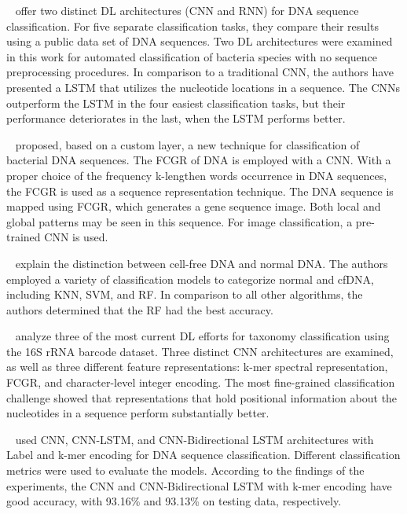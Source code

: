 \citeauthor{LoBosco2017DeepClassification}~\cite{LoBosco2017DeepClassification} offer two distinct \gls{DL} architectures (\gls{CNN} and \gls{RNN}) for \gls{DNA} sequence classification. For five separate classification tasks, they compare their results using a public data set of \gls{DNA} sequences. Two \gls{DL} architectures were examined in this work for automated classification of bacteria species with no sequence preprocessing procedures. In comparison to a traditional \gls{CNN}, the authors have presented a \gls{LSTM} that utilizes the nucleotide locations in a sequence. The \gls{CNN}s outperform the \gls{LSTM} in the four easiest classification tasks, but their performance deteriorates in the last, when the \gls{LSTM} performs better. %

\citeauthor{Abd-Alhalem2020BacterialLayers}~\cite{Abd-Alhalem2020BacterialLayers} proposed, based on a custom layer, a new technique for classification of bacterial \gls{DNA} sequences. The \gls{FCGR} of \gls{DNA} is employed with a \gls{CNN}. With a proper choice of the frequency k-lengthen words occurrence in \gls{DNA} sequences, the \gls{FCGR} is used as a sequence representation technique. The \gls{DNA} sequence is mapped using \gls{FCGR}, which generates a gene sequence image. Both local and global patterns may be seen in this sequence. For image classification, a pre-trained \gls{CNN} is used. 

\citeauthor{Chen2017AClassification}~\cite{Chen2017AClassification} explain the distinction between cell-free DNA and normal DNA. The authors employed a variety of classification models to categorize normal and cfDNA, including \gls{KNN}, \gls{SVM}, and \gls{RF}. In comparison to all other algorithms, the authors determined that the \gls{RF} had the best accuracy. %

\citeauthor{Helaly2019ConvolutionalStudy}~\cite{Helaly2019ConvolutionalStudy} analyze three of the most current \gls{DL} efforts for taxonomy classification using the 16S rRNA barcode dataset. Three distinct \gls{CNN} architectures are examined, as well as three different feature representations: k-mer spectral representation, \gls{FCGR}, and character-level integer encoding. The most fine-grained classification challenge showed that representations that hold positional information about the nucleotides in a sequence perform substantially better.

\citeauthor{Gunasekaran2021AnalysisModels}~\cite{Gunasekaran2021AnalysisModels} used \gls{CNN}, \gls{CNN}-\gls{LSTM}, and \gls{CNN}-Bidirectional \gls{LSTM} architectures with Label and k-mer encoding for \gls{DNA} sequence classification. Different classification metrics were used to evaluate the models. According to the findings of the experiments, the \gls{CNN} and \gls{CNN}-Bidirectional \gls{LSTM} with k-mer encoding have good accuracy, with 93.16\% and 93.13\% on testing data, respectively.

